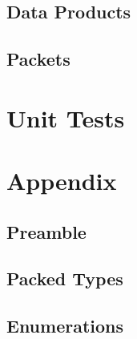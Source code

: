

\subsection{Data Products}



\subsection{Packets}



\section{Unit Tests}



\section{Appendix}
\subsection{Preamble}



\subsection{Packed Types}



\subsection{Enumerations}




